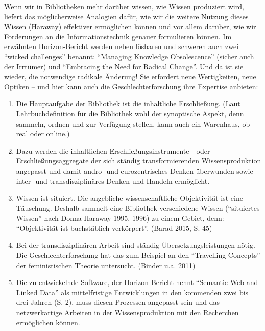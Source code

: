 Wenn wir in Bibliotheken mehr darüber wissen, wie Wissen produziert
wird, liefert das möglicherweise Analogien dafür, wie wir die weitere
Nutzung dieses Wissen (Haraway) effektiver ermöglichen können und vor
allem darüber, wie wir Forderungen an die Informationstechnik genauer
formulieren können. Im erwähnten Horizon-Bericht werden neben lösbaren
und schweren auch zwei \enquote{wicked challenges} benannt:
\enquote{Managing Knowledge Obsolescence} (sicher auch der Irrtümer) und
\enquote{Embracing the Need for Radical Change}. Und da ist sie wieder,
die notwendige radikale Änderung! Sie erfordert neue Wertigkeiten, neue
Optiken -- und hier kann auch die Geschlechterforschung ihre Expertise
anbieten:

\begin{enumerate}
\def\labelenumi{\arabic{enumi}.}
\item
  Die Hauptaufgabe der Bibliothek ist die inhaltliche Erschließung.
  (Laut Lehrbuchdefinition für die Bibliothek wohl der synoptische
  Aspekt, denn sammeln, ordnen und zur Verfügung stellen, kann auch ein
  Warenhaus, ob real oder online.)
\item
  Dazu werden die inhaltlichen Erschließungsinstrumente - oder
  Erschließungsaggregate der sich ständig transformierenden
  Wissensproduktion angepasst und damit andro- und eurozentrisches
  Denken überwunden sowie inter- und transdisziplinäres Denken und
  Handeln ermöglicht.
\item
  Wissen ist situiert. Die angebliche wissenschaftliche Objektivität ist
  eine Täuschung. Deshalb sammelt eine Bibliothek verschiedene Wissen
  (\enquote{situiertes Wissen} nach Donna Haraway 1995, 1996) zu einem
  Gebiet, denn: \enquote{Objektivität ist buchstäblich verkörpert}.
  (Barad 2015, S. 45)
\item
  Bei der transdisziplinären Arbeit sind ständig Übersetzungsleistungen
  nötig. Die Geschlechterforschung hat das zum Beispiel an den
  \enquote{Travelling Concepts} der feministischen Theorie untersucht.
  (Binder u.a. 2011)
\item
  Die zu entwickelnde Software, der Horizon-Bericht nennt
  \enquote{Semantic Web and Linked Data} als mittelfristige
  Entwicklungen in den kommenden zwei bis drei Jahren (S. 2), muss
  diesen Prozessen angepasst sein und das netzwerkartige Arbeiten in der
  Wissensproduktion mit den Recherchen ermöglichen können.
\end{enumerate}

